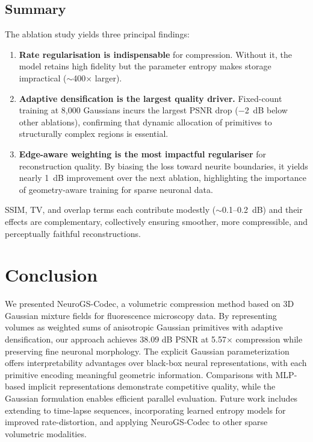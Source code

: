 \documentclass[11pt,a4paper]{article}
\begin{document}
\subsection{Summary}

The ablation study yields three principal findings:
\begin{enumerate}
    \item \textbf{Rate regularisation is indispensable} for compression.  Without it, the model retains high fidelity but the parameter entropy makes storage impractical ($\sim$400$\times$ larger).
    \item \textbf{Adaptive densification is the largest quality driver.}  Fixed-count training at 8{,}000 Gaussians incurs the largest PSNR drop ($-$2~dB below other ablations), confirming that dynamic allocation of primitives to structurally complex regions is essential.
    \item \textbf{Edge-aware weighting is the most impactful regulariser} for reconstruction quality.  By biasing the loss toward neurite boundaries, it yields nearly 1~dB improvement over the next ablation, highlighting the importance of geometry-aware training for sparse neuronal data.
\end{enumerate}

SSIM, TV, and overlap terms each contribute modestly ($\sim$0.1--0.2~dB) and their effects are complementary, collectively ensuring smoother, more compressible, and perceptually faithful reconstructions.

\section{Conclusion}
\label{sec:conclusion}

We presented NeuroGS-Codec, a volumetric compression method based on 3D Gaussian mixture fields for fluorescence microscopy data. By representing volumes as weighted sums of anisotropic Gaussian primitives with adaptive densification, our approach achieves 38.09 dB PSNR at 5.57$\times$ compression while preserving fine neuronal morphology. The explicit Gaussian parameterization offers interpretability advantages over black-box neural representations, with each primitive encoding meaningful geometric information. Comparisons with MLP-based implicit representations demonstrate competitive quality, while the Gaussian formulation enables efficient parallel evaluation. Future work includes extending to time-lapse sequences, incorporating learned entropy models for improved rate-distortion, and applying NeuroGS-Codec to other sparse volumetric modalities.
\end{document}
